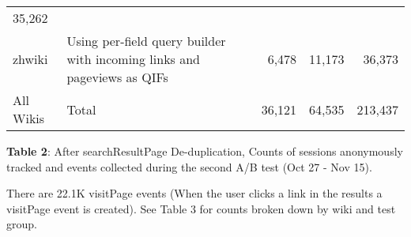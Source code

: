 \documentclass[12pt,]{article}
\begin{document}
\begin{longtable}[]{@{}llrrr@{}}
\begin{minipage}[t]{0.11\columnwidth}
35,262\strut
\end{minipage}\tabularnewline
\begin{minipage}[t]{0.07\columnwidth}\raggedright\strut
zhwiki\strut
\end{minipage} & \begin{minipage}[t]{0.46\columnwidth}\raggedright\strut
Using per-field query builder with incoming links and pageviews as
QIFs\strut
\end{minipage} & \begin{minipage}[t]{0.11\columnwidth}\raggedleft\strut
6,478\strut
\end{minipage} & \begin{minipage}[t]{0.12\columnwidth}\raggedleft\strut
11,173\strut
\end{minipage} & \begin{minipage}[t]{0.11\columnwidth}\raggedleft\strut
36,373\strut
\end{minipage}\tabularnewline
\begin{minipage}[t]{0.07\columnwidth}\raggedright\strut
All Wikis\strut
\end{minipage} & \begin{minipage}[t]{0.46\columnwidth}\raggedright\strut
Total\strut
\end{minipage} & \begin{minipage}[t]{0.11\columnwidth}\raggedleft\strut
36,121\strut
\end{minipage} & \begin{minipage}[t]{0.12\columnwidth}\raggedleft\strut
64,535\strut
\end{minipage} & \begin{minipage}[t]{0.11\columnwidth}\raggedleft\strut
213,437\strut
\end{minipage}\tabularnewline
\bottomrule
\end{longtable}

\textbf{Table 2}: After searchResultPage De-duplication, Counts of
sessions anonymously tracked and events collected during the second A/B
test (Oct 27 - Nov 15).

There are 22.1K visitPage events (When the user clicks a link in the
results a visitPage event is created). See Table 3 for counts broken
down by wiki and test group.
\end{document}
